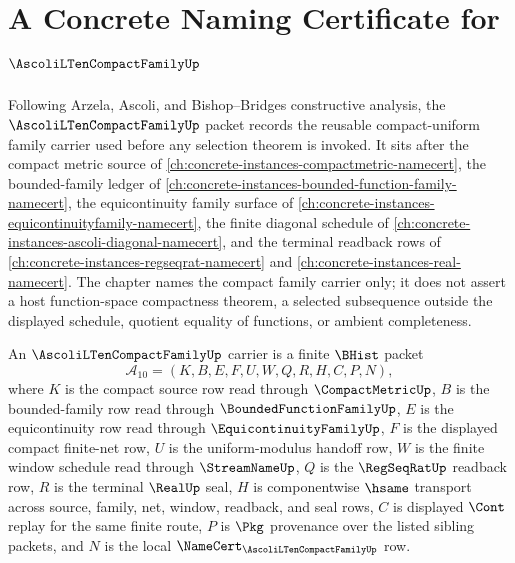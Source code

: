 \chapter{A Concrete Naming Certificate for $\AscoliLTenCompactFamilyUp$}
\label{ch:concrete-instances-ascoli-l10-compact-family-namecert}

Following Arzela, Ascoli, and Bishop--Bridges constructive analysis, the $\AscoliLTenCompactFamilyUp$ packet records the reusable compact-uniform family carrier used before any selection theorem is invoked. It sits after the compact metric source of \autoref{ch:concrete-instances-compactmetric-namecert}, the bounded-family ledger of \autoref{ch:concrete-instances-bounded-function-family-namecert}, the equicontinuity family surface of \autoref{ch:concrete-instances-equicontinuityfamily-namecert}, the finite diagonal schedule of \autoref{ch:concrete-instances-ascoli-diagonal-namecert}, and the terminal readback rows of \autoref{ch:concrete-instances-regseqrat-namecert} and \autoref{ch:concrete-instances-real-namecert}. The chapter names the compact family carrier only; it does not assert a host function-space compactness theorem, a selected subsequence outside the displayed schedule, quotient equality of functions, or ambient completeness.

\begin{definition}\label{def:ascoli-l10-uniform-compact-family-carrier}
An $\AscoliLTenCompactFamilyUp$ carrier is a finite $\BHist$ packet
$$
\mathcal{A}_{10}=(K,B,E,F,U,W,Q,R,H,C,P,N),
$$
where $K$ is the compact source row read through $\CompactMetricUp$, $B$ is the bounded-family row read through $\BoundedFunctionFamilyUp$, $E$ is the equicontinuity row read through $\EquicontinuityFamilyUp$, $F$ is the displayed compact finite-net row, $U$ is the uniform-modulus handoff row, $W$ is the finite window schedule read through $\StreamNameUp$, $Q$ is the $\RegSeqRatUp$ readback row, $R$ is the terminal $\RealUp$ seal, $H$ is componentwise $\hsame$ transport across source, family, net, window, readback, and seal rows, $C$ is displayed $\Cont$ replay for the same finite route, $P$ is $\Pkg$ provenance over the listed sibling packets, and $N$ is the local $\NameCert_{\AscoliLTenCompactFamilyUp}$ row.
\end{definition}

